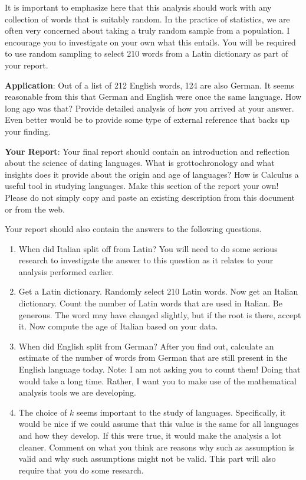 \documentclass
[justified,nohyper]
{tufte-handout}
\begin{document}
It is important to emphasize here that this analysis should work with any collection of words that is suitably random. In the practice of statistics, we are often very concerned about taking a truly random sample from a population. I encourage you to investigate on your own what this entails. You will be required to use random sampling to select 210 words from a Latin dictionary as part of your report.

\textbf{Application}: Out of a list of 212 English words, 124 are also German. It seems reasonable from this that German and English were once the same language. How long ago was that? Provide detailed analysis of how you arrived at your answer. Even better would be to provide some type of external reference that backs up your finding.

\textbf{Your Report}: Your final report should contain an introduction and reflection about the science of dating languages. What is grottochronology and what insights does it provide about the origin and age of languages? How is Calculus a useful tool in studying languages. Make this section of the report your own! Please do not simply copy and paste an existing description from this document or from the web.

Your report should also contain the answers to the following questions.

\begin{enumerate}
  \item When did Italian split off from Latin? You will need to do some serious research to investigate the answer to this question as it relates to your analysis performed earlier.
  \item Get a Latin dictionary. Randomly select 210 Latin words. Now get an Italian dictionary. Count the number of Latin words that are used in Italian. Be generous. The word may have changed slightly, but if the root is there, accept it. Now compute the age of Italian based on your data.
  \item When did English split from German? After you find out, calculate an estimate of the number of words from German that are still present in the English language today. Note: I am not asking you to count them! Doing that would take a long time. Rather, I want you to make use of the mathematical analysis tools we are developing.
  \item The choice of $k$ seems important to the study of languages. Specifically, it would be nice if we could assume that this value is the same for all languages and how they develop. If this were true, it would make the analysis a lot cleaner. Comment on what you think are reasons why such as assumption is valid and why such assumptions might not be valid. This part will also require that you do some research.
\end{enumerate}
\end{document}
